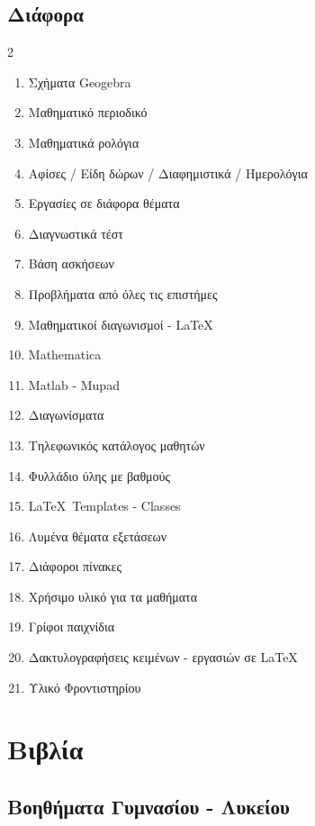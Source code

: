 \documentclass[11pt,a4paper]{book}
\begin{document}
\section{Διάφορα}
\begin{multicols}{2}
\begin{enumerate}[label=\arabic*]
\item Σχήματα Geogebra
\item Μαθηματικό περιοδικό
\item Μαθηματικά ρολόγια
\item Αφίσες / Είδη δώρων / Διαφημιστικά / Ημερολόγια
\item Εργασίες σε διάφορα θέματα
\item Διαγνωστικά τέστ
\item Βάση ασκήσεων
\item Προβλήματα από όλες τις επιστήμες
\item Μαθηματικοί διαγωνισμοί - LaTeX
\item Mathematica
\item Matlab - Mupad
\item Διαγωνίσματα
\item Τηλεφωνικός κατάλογος μαθητών
\item Φυλλάδιο ύλης με βαθμούς
\item \LaTeX\ Templates - Classes
\item Λυμένα θέματα εξετάσεων
\item Διάφοροι πίνακες
\item Χρήσιμο υλικό για τα μαθήματα
\item Γρίφοι παιχνίδια
\item Δακτυλογραφήσεις κειμένων - εργασιών σε \LaTeX
\item Υλικό Φροντιστηρίου
\end{enumerate}
\end{multicols}
\newpage
\chapter{Βιβλία}
\section{Βοηθήματα Γυμνασίου - Λυκείου}
\end{document}

